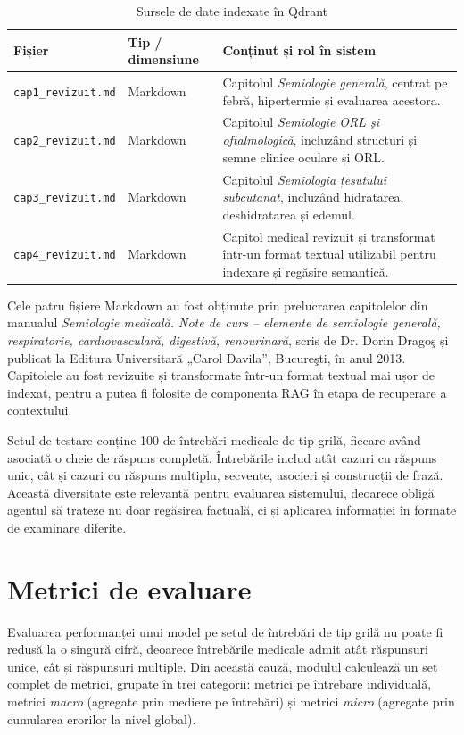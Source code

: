 \documentclass[12pt, a4paper, oneside, romanian]{teza-upb}
\begin{document}
\begin{table}[H]
\centering
\caption{Sursele de date indexate în Qdrant}
\label{tab:surse-ingestie}
\small
\begin{tabular}{|p{4.2cm}|p{2.3cm}|p{6.5cm}|}
\hline
\textbf{Fișier} & \textbf{Tip / dimensiune} & \textbf{Conținut și rol în sistem} \\
\hline
\texttt{cap1\_revizuit.md} & Markdown & Capitolul \textit{Semiologie generală}, centrat pe febră, hipertermie și evaluarea acestora. \\
\hline
\texttt{cap2\_revizuit.md} & Markdown & Capitolul \textit{Semiologie ORL şi oftalmologică}, incluzând structuri și semne clinice oculare și ORL. \\
\hline
\texttt{cap3\_revizuit.md} & Markdown & Capitolul \textit{Semiologia țesutului subcutanat}, incluzând hidratarea, deshidratarea și edemul. \\
\hline
\texttt{cap4\_revizuit.md} & Markdown & Capitol medical revizuit și transformat într-un format textual utilizabil pentru indexare și regăsire semantică. \\
\hline
\end{tabular}
\end{table}

Cele patru fișiere Markdown au fost obținute prin prelucrarea capitolelor din manualul \textit{Semiologie medicală. Note de curs -- elemente de semiologie generală, respiratorie, cardiovasculară, digestivă, renourinară}, scris de Dr. Dorin Dragoş și publicat la Editura Universitară „Carol Davila”, Bucureşti, în anul 2013. Capitolele au fost revizuite și transformate într-un format textual mai ușor de indexat, pentru a putea fi folosite de componenta RAG în etapa de recuperare a contextului.

Setul de testare conține 100 de întrebări medicale de tip grilă, fiecare având asociată o cheie de răspuns completă. Întrebările includ atât cazuri cu răspuns unic, cât și cazuri cu răspuns multiplu, secvențe, asocieri și construcții de frază. Această diversitate este relevantă pentru evaluarea sistemului, deoarece obligă agentul să trateze nu doar regăsirea factuală, ci și aplicarea informației în formate de examinare diferite.

\section{Metrici de evaluare}

Evaluarea performanței unui model pe setul de întrebări de tip grilă nu poate fi redusă la o singură cifră, deoarece întrebările medicale admit atât răspunsuri unice, cât și răspunsuri multiple. Din această cauză, modulul calculează un set complet de metrici, grupate în trei categorii: metrici pe întrebare individuală, metrici \textit{macro} (agregate prin mediere pe întrebări) și metrici \textit{micro} (agregate prin cumularea erorilor la nivel global).
\end{document}
